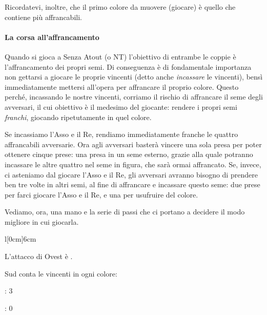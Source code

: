 \documentclass[../corsofiori.tex]{subfiles}
\begin{document}
Ricordatevi, inoltre, che il primo colore da muovere (giocare) è quello che contiene più affrancabili.



\paragraph{La corsa all'affrancamento} Quando si gioca a Senza Atout (\SA o \small{NT}\normalsize) l'obiettivo di
entrambe le coppie è l'affrancamento dei propri semi. Di conseguenza è di fondamentale importanza non gettarsi a giocare
le proprie vincenti (detto anche \emph{incassare} le vincenti), bensì immediatamente mettersi all'opera per affrancare
il proprio colore. Questo perché, incassando le nostre vincenti,
corriamo il rischio di affrancare il seme degli avversari, il cui obiettivo è il medesimo del giocante: rendere i propri semi \emph{franchi},
giocando ripetutamente in quel colore.



\medskip

    Se incassiamo l'Asso e il Re, rendiamo immediatamente franche le quattro affrancabili avversarie. Ora agli avversari
    basterà vincere una sola presa per poter ottenere cinque prese: una presa in un seme esterno, grazie alla quale
    potranno incassare le altre quattro nel seme in figura, che sarà ormai affrancato.
   Se, invece, ci asteniamo dal giocare l'Asso e il Re, gli avversari avranno bisogno di prendere ben tre volte in altri
   semi, al fine di affrancare e incassare questo seme: due prese per farci giocare l'Asso e il Re, e una per usufruire
   del colore.

   Vediamo, ora, una mano e la serie di passi che ci portano a decidere il modo migliore in cui giocarla.

    \newpage




\begin{wraptable}[11]{l}[0cm]{6cm}
    \vspace{-.5cm}
    \showNS*
\end{wraptable}

\noindent L'attacco di Ovest è \Ten\Di.

\noindent Sud conta le vincenti in ogni colore:

\Sp: 3

\He: 0
\end{document}
